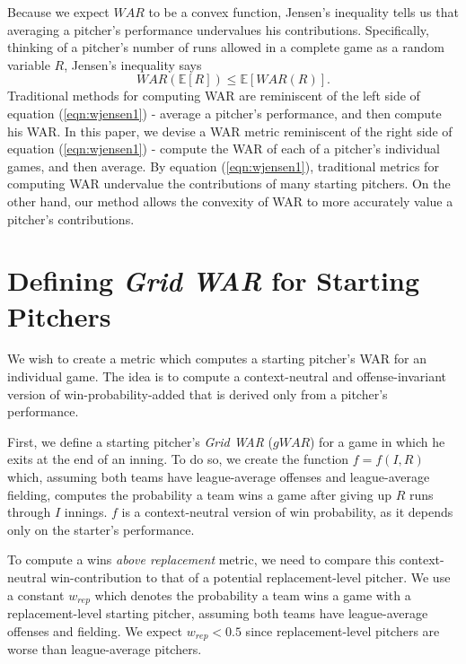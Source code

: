 \documentclass[12pt]{article}
\newcommand{\E}{{\mathbb E}}
\begin{document}
Because we expect $WAR$ to be a convex function, Jensen's inequality tells us that averaging a pitcher's performance undervalues his contributions. Specifically, thinking of a pitcher's number of runs allowed in a complete game as a random variable $R$, Jensen's inequality says
\begin{equation}
WAR(\E[R]) \leq \E[WAR(R)].
\label{eqn:wjensen1}
\end{equation}
Traditional methods for computing WAR are reminiscent of the left side of equation (\ref{eqn:wjensen1}) - average a pitcher's performance, and then compute his WAR. In this paper, we devise a WAR metric reminiscent of the right side of equation (\ref{eqn:wjensen1}) - compute the WAR of each of a pitcher's individual games, and then average. By equation (\ref{eqn:wjensen1}), traditional metrics for computing WAR undervalue the contributions of many starting pitchers. On the other hand, our method allows the convexity of WAR to more accurately value a pitcher's contributions.

\section{Defining \textit{Grid WAR} for Starting Pitchers}

We wish to create a metric which computes a starting pitcher's WAR for an individual game. The idea is to compute a context-neutral and offense-invariant version of win-probability-added that is derived only from a pitcher's performance. 

First, we define a starting pitcher's \textit{Grid WAR} ($gWAR$) for a game in which he exits at the end of an inning. To do so, we create the function $f=f(I,R)$ which, assuming both teams have league-average offenses and league-average fielding, computes the probability a team wins a game after giving up $R$ runs through $I$ innings. $f$ is a context-neutral version of win probability, as it depends only on the starter's performance. 

To compute a wins \textit{above replacement} metric, we need to compare this context-neutral win-contribution to that of a potential replacement-level pitcher. We use a constant $w_{rep}$ which denotes the probability a team wins a game with a replacement-level starting pitcher, assuming both teams have league-average offenses and fielding. We expect $w_{rep} < 0.5$ since replacement-level pitchers are worse than league-average pitchers. 
\end{document}
